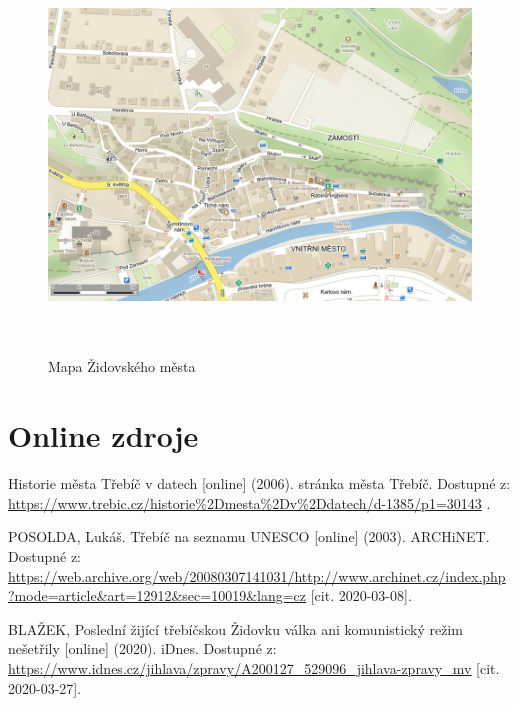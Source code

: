 \documentclass[a4paper,oneside,12pt]{report}
\let\openright=\clearpage
\begin{document}
\begin{figure}
	\centering
	\includegraphics[height=10.5cm]{../img/mapaZidovskehoMesta.png}
	\caption[Mapa Židovského města \text{[online]} Mapy.cz. Dostupné z: \url{https://en.mapy.cz/zakladni?x=15.8789945&y=49.2182114&z=17&source=muni&id=5517} ]{
		Mapa Židovského města
	}
	\label{fig:map}
\end{figure}

\chapter*{}

\setcounter{page}{7}





\chapter*{Online zdroje}
\noindent
Historie města Třebíč v datech [online] (2006). stránka města Třebíč. Dostupné z: \url{https://www.trebic.cz/historie\%2Dmesta\%2Dv\%2Ddatech/d-1385/p1=30143} \linebreak[4] [cit. 2020-03-08].

\vspace{0.5cm}
\noindent
POSOLDA, Lukáš. Třebíč na seznamu UNESCO [online] (2003). ARCHiNET. Dostupné z: \url{https://web.archive.org/web/20080307141031/http://www.archinet.cz/index.php?mode=article&art=12912&sec=10019&lang=cz}  [cit. 2020-03-08].

\vspace{0.5cm}
\noindent
BLAŽEK, Poslední žijící třebíčskou Židovku válka ani komunistický režim nešetřily [online] (2020). iDnes. Dostupné z: \url{https://www.idnes.cz/jihlava/zpravy/A200127_529096_jihlava-zpravy_mv} [cit. 2020-03-27].
\listoffigures
\openright
\end{document}
